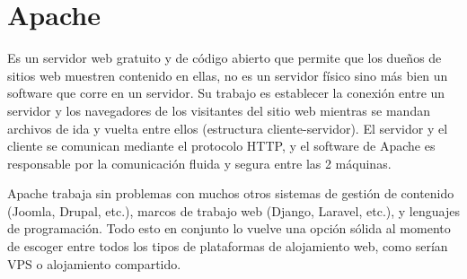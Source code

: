 \documentclass[12pt, a4paper, titlepage]{report}
\begin{document}
	    
	    
	    \section{Apache}
	 	Es un servidor web gratuito y de código abierto que permite que los dueños de sitios web muestren contenido en ellas, no es un servidor físico sino más bien un software que corre en un servidor.
	 	Su trabajo es establecer la conexión entre un servidor y los navegadores de los visitantes del sitio web mientras se mandan archivos de ida y vuelta entre ellos (estructura cliente-servidor). El servidor y el cliente se comunican mediante el protocolo HTTP, y el software de Apache es responsable por la comunicación fluida y segura entre las 2 máquinas.\par
	 	Apache trabaja sin problemas con muchos otros sistemas de gestión de contenido (Joomla, Drupal, etc.), marcos de trabajo web (Django, Laravel, etc.), y lenguajes de programación. Todo esto en conjunto lo vuelve una opción sólida al momento de escoger entre todos los tipos de plataformas de alojamiento web, como serían VPS o alojamiento compartido.\\
		
		\newpage
		
\end{document}
